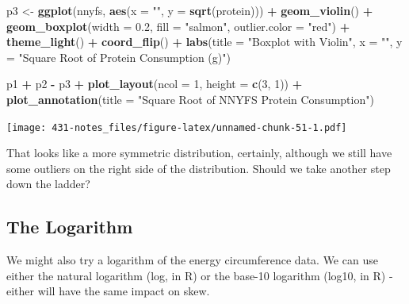 \documentclass[
]{book}
\newenvironment{Shaded}{\begin{snugshade}}{\end{snugshade}}
\newcommand{\DataTypeTok}[1]{\textcolor[rgb]{0.13,0.29,0.53}{#1}}
\newcommand{\DecValTok}[1]{\textcolor[rgb]{0.00,0.00,0.81}{#1}}
\newcommand{\FloatTok}[1]{\textcolor[rgb]{0.00,0.00,0.81}{#1}}
\newcommand{\KeywordTok}[1]{\textcolor[rgb]{0.13,0.29,0.53}{\textbf{#1}}}
\newcommand{\NormalTok}[1]{#1}
\newcommand{\OperatorTok}[1]{\textcolor[rgb]{0.81,0.36,0.00}{\textbf{#1}}}
\newcommand{\StringTok}[1]{\textcolor[rgb]{0.31,0.60,0.02}{#1}}
\begin{document}
\begin{Shaded}
\begin{Highlighting}[]
\NormalTok{p3 <-}\StringTok{ }\KeywordTok{ggplot}\NormalTok{(nnyfs, }\KeywordTok{aes}\NormalTok{(}\DataTypeTok{x =} \StringTok{""}\NormalTok{, }\DataTypeTok{y =} \KeywordTok{sqrt}\NormalTok{(protein))) }\OperatorTok{+}
\StringTok{    }\KeywordTok{geom_violin}\NormalTok{() }\OperatorTok{+}
\StringTok{    }\KeywordTok{geom_boxplot}\NormalTok{(}\DataTypeTok{width =} \FloatTok{0.2}\NormalTok{, }\DataTypeTok{fill =} \StringTok{"salmon"}\NormalTok{, }
                 \DataTypeTok{outlier.color =} \StringTok{"red"}\NormalTok{) }\OperatorTok{+}
\StringTok{    }\KeywordTok{theme_light}\NormalTok{() }\OperatorTok{+}
\StringTok{    }\KeywordTok{coord_flip}\NormalTok{() }\OperatorTok{+}
\StringTok{    }\KeywordTok{labs}\NormalTok{(}\DataTypeTok{title =} \StringTok{"Boxplot with Violin"}\NormalTok{,}
         \DataTypeTok{x =} \StringTok{""}\NormalTok{, }\DataTypeTok{y =} \StringTok{"Square Root of Protein Consumption (g)"}\NormalTok{)}

\NormalTok{p1 }\OperatorTok{+}\StringTok{ }\NormalTok{p2 }\OperatorTok{-}\StringTok{ }\NormalTok{p3 }\OperatorTok{+}\StringTok{ }\KeywordTok{plot_layout}\NormalTok{(}\DataTypeTok{ncol =} \DecValTok{1}\NormalTok{, }\DataTypeTok{height =} \KeywordTok{c}\NormalTok{(}\DecValTok{3}\NormalTok{, }\DecValTok{1}\NormalTok{)) }\OperatorTok{+}
\StringTok{    }\KeywordTok{plot_annotation}\NormalTok{(}\DataTypeTok{title =} \StringTok{"Square Root of NNYFS Protein Consumption"}\NormalTok{)}
\end{Highlighting}
\end{Shaded}

\texttt{[image: 431-notes\_files/figure-latex/unnamed-chunk-51-1.pdf]}

That looks like a more symmetric distribution, certainly, although we still have some outliers on the right side of the distribution. Should we take another step down the ladder?

\hypertarget{the-logarithm}{%
\subsection{The Logarithm}\label{the-logarithm}}

We might also try a logarithm of the energy circumference data. We can use either the natural logarithm (log, in R) or the base-10 logarithm (log10, in R) - either will have the same impact on skew.
\end{document}
